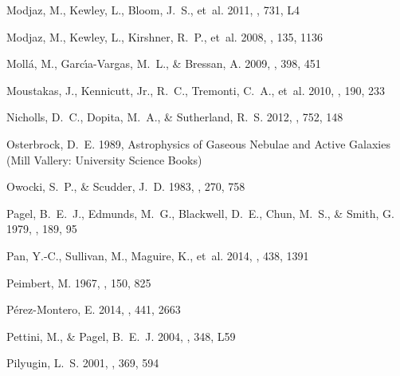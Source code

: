 \documentclass{emulateapj}
\begin{document}
\begin{thebibliography}{}
{Modjaz}, M., {Kewley}, L., {Bloom}, J.~S., {et~al.} 2011, \apjl, 731, L4

{Modjaz}, M., {Kewley}, L., {Kirshner}, R.~P., {et~al.} 2008, \aj, 135, 1136

{Moll{\'a}}, M., {Garc{\'{\i}}a-Vargas}, M.~L., \& {Bressan}, A. 2009, \mnras,
  398, 451

{Moustakas}, J., {Kennicutt}, Jr., R.~C., {Tremonti}, C.~A., {et~al.} 2010,
  \apjs, 190, 233

{Nicholls}, D.~C., {Dopita}, M.~A., \& {Sutherland}, R.~S. 2012, \apj, 752, 148

{Osterbrock}, D.~E. 1989, {Astrophysics of Gaseous Nebulae and Active Galaxies}
  (Mill Vallery: University Science Books)

{Owocki}, S.~P., \& {Scudder}, J.~D. 1983, \apj, 270, 758

{Pagel}, B.~E.~J., {Edmunds}, M.~G., {Blackwell}, D.~E., {Chun}, M.~S., \&
  {Smith}, G. 1979, \mnras, 189, 95

{Pan}, Y.-C., {Sullivan}, M., {Maguire}, K., {et~al.} 2014, \mnras, 438, 1391

{Peimbert}, M. 1967, \apj, 150, 825

{P{\'e}rez-Montero}, E. 2014, \mnras, 441, 2663

{Pettini}, M., \& {Pagel}, B.~E.~J. 2004, \mnras, 348, L59

{Pilyugin}, L.~S. 2001, \aap, 369, 594


\end{thebibliography}
\end{document}
